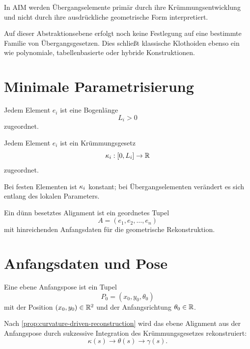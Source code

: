 In AIM werden Übergangselemente primär durch ihre Krümmungsentwicklung und
nicht durch ihre ausdrückliche geometrische Form interpretiert.

Auf dieser Abstraktionsebene erfolgt noch keine Festlegung auf eine bestimmte
Familie von Übergangsgesetzen. Dies schließt klassische Klothoiden ebenso ein
wie polynomiale, tabellenbasierte oder hybride Konstruktionen.


\section{Minimale Parametrisierung}

\begin{definition}
Jedem Element \(e_i\) ist eine Bogenlänge
\[
L_i > 0
\]
zugeordnet.
\end{definition}

\begin{definition}
Jedem Element \(e_i\) ist ein Krümmungsgesetz
\[
\kappa_i : [0,L_i] \to \mathbb{R}
\]
zugeordnet.
\end{definition}

Bei festen Elementen ist \(\kappa_i\) konstant; bei Übergangselementen
verändert es sich entlang des lokalen Parameters.

\begin{definition}
Ein dünn besetztes Alignment ist ein geordnetes Tupel
\[
A=(e_1,e_2,\dots,e_n)
\]
mit hinreichenden Anfangsdaten für die geometrische Rekonstruktion.
\end{definition}

\section{Anfangsdaten und Pose}

\begin{definition}
Eine ebene Anfangspose ist ein Tupel
\[
P_0=(x_0,y_0,\theta_0)
\]
mit der Position \((x_0,y_0)\in\mathbb{R}^2\) und der Anfangsrichtung
\(\theta_0\in\mathbb{R}\).
\end{definition}

\begin{corollary}[Rekonstruktionskette]
\label{cor:sparse-reconstruction-chain}
Nach \cref{prop:curvature-driven-reconstruction} wird das ebene Alignment
aus der Anfangspose durch sukzessive Integration des Krümmungsgesetzes
rekonstruiert:
\[
\kappa(s)\rightarrow\theta(s)\rightarrow\gamma(s).
\]
\end{corollary}

